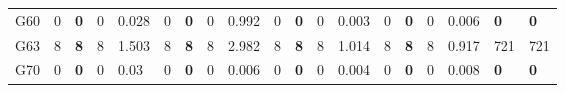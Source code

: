 \documentclass[12pt, a4paper]{article}%
\numberwithin{equation}{section}
\theoremstyle{plain}
\begin{document}
{\begin{landscape}
\begin{longtable}{lllllllllllllllllll}
						G60                                           & 0    & \textbf{0}  & 0   & 0.028 & 0    & \textbf{0}  & 0   & 0.992 & 0    & \textbf{0}  & 0   & 0.003 & 0    & \textbf{0}  & 0   & 0.006 & \textbf{0}                                  & \textbf{0}                               \\
						G63                                           & 8    & \textbf{8}  & 8   & 1.503 & 8    & \textbf{8}  & 8   & 2.982 & 8    & \textbf{8}  & 8   & 1.014 & 8    & \textbf{8}  & 8   & 0.917 & 721                                         & 721                                      \\
						G70                                           & 0    & \textbf{0}  & 0   & 0.03  & 0    & \textbf{0}  & 0   & 0.006 & 0    & \textbf{0}  & 0   & 0.004 & 0    & \textbf{0}  & 0   & 0.008 & \textbf{0}                                  & \textbf{0}                          \\ \hline
					\end{longtable}
				\end{landscape}
			}
			
\end{document}
